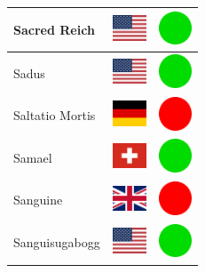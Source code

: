 \documentclass[12pt, a4paper, twoside]{report}
\begin{document}
\begin{center}
\begin{longtable}{|p{5cm}|p{2cm}|p{2cm}|}
 Sacred Reich                                               & \includegraphics[width=1cm]{../img/flags/us} &   \includegraphics[width=1cm]{../likes/y} \\ \hline
 Sadus                                                      & \includegraphics[width=1cm]{../img/flags/us} &   \includegraphics[width=1cm]{../likes/y} \\ \hline
 Saltatio Mortis                                            & \includegraphics[width=1cm]{../img/flags/de} &   \includegraphics[width=1cm]{../likes/n} \\ \hline
 Samael                                                     & \includegraphics[width=1cm]{../img/flags/ch} &   \includegraphics[width=1cm]{../likes/y} \\ \hline
 Sanguine                                                   & \includegraphics[width=1cm]{../img/flags/gb} &   \includegraphics[width=1cm]{../likes/n} \\ \hline
 Sanguisugabogg                                             & \includegraphics[width=1cm]{../img/flags/us} &   \includegraphics[width=1cm]{../likes/y} \\ \hline

\end{longtable}
\end{center}
\end{document}
